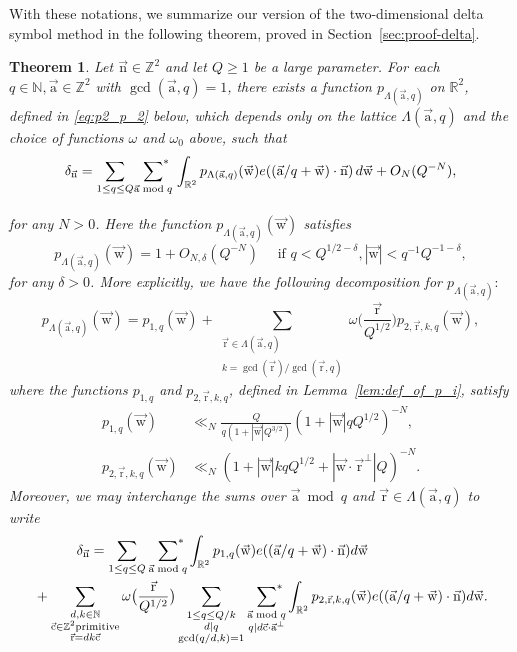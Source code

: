 \documentclass[letterpaper,11pt]{amsart}
\numberwithin{equation}{section}
\newtheorem{theorem}{Theorem}[section]
\theoremstyle{definition}
\numberwithin{equation}{section}
\newcommand{\Z}{\mathbb{Z}}
\newcommand{\ZZ}{\mathbb{Z}}
\newcommand{\NN}{\mathbb{N}}
\newcommand{\RR}{\mathbb{R}}
\renewcommand{\d}{\mathbf{d}}
\newcommand{\starsum}{\sideset{}{^*}\sum}
\newcommand{\ua}{\vec{\mathrm{a}}}
\newcommand{\ur}{\vec{\mathrm{r}}}
\newcommand{\uw}{{\vec{\mathrm{w}}}}
\newcommand{\uc}{{\vec{\mathrm{c}}}}
\newcommand{\N}{\mathbb{N}}
\newcommand{\R}{\mathbb{R}}
\newcommand{\nn}{\vec{\mathrm{n}}}
\begin{document}
With these notations, we summarize our version of the  two-dimensional delta symbol method in the following theorem, proved in Section~\ref{sec:proof-delta}.



\begin{theorem}\label{thm:delta}
		Let $\nn \in \mathbb Z^2$ and let $Q\geq 1$ be a large parameter.
	For each \(q\in \N,\ua\in \Z^2\) with \(\gcd(\ua,q)=1\),
	 there exists a function $p_{\Lambda(\ua,q)}$ on $\RR^2$, defined in \eqref{eq:p2_p_2} below, which depends only on the lattice \(\Lambda(\ua,q)\) and the choice of functions \(\omega\) and \(\omega_0\) above, such that
	\begin{equation}\label{eq:delta}
			\delta_{\nn}
			=
			\sum_{1\leq q\leq Q}
			\underset{\hphantom{\ua\bmod{q}}}{\starsum_{\ua\bmod{q}}}			
			\int_{\R^2}
			p_{\Lambda(\ua,q)}(\uw)
			e((\ua/q+\uw)\cdot\nn)\,d\uw
	+O_{N}(Q^{-N}),
	\end{equation}
	for any $N>0$.
Here the function
\(p_{\Lambda(\ua,q)}(\uw)\)  
satisfies 
\begin{equation}
    	\label{eq:p1bound1}
	p_{\Lambda(\ua,q)}(\uw)
	= 1+O_{N, \delta}(Q^{-N})
	\quad \text{ if } q< Q^{1/2-\delta},
	|\uw| < q^{-1} Q^{-1-\delta},
\end{equation}
for any $\delta>0$. More explicitly, we have the following decomposition for $p_{\Lambda(\ua,q)}:$ $$
p_{\Lambda(\ua,q)}(\uw)
=
 p_{1, q}(\uw)
 +	\sum_{\substack{\ur\in \Lambda(\ua,q)\\ k=\gcd(
 		\ur)/\gcd(\ur, q)}}\omega\big(\frac{\ur}{Q^{1/2}}\big) p_{2,\ur,k,q}(\uw),
 $$
where the functions $p_{1, q}$ and $p_{2,\ur,k,q}$, defined in Lemma~\ref{lem:def_of_p_i}, satisfy
	\begin{align}\label{eq:p1bound2}
	p_{1, q}(\uw)&\ll _N \frac{Q}{q(1+|\uw|Q^{3/2})}(1+|\uw|qQ^{1/2})^{-N},\\
 \label{eq:p1bound3}
p_{2,\ur,k,q}(\uw)
&\ll_{N}
(1+|\uw|kqQ^{1/2}+|\uw\cdot \ur^\perp|Q)^{-N}.
	\end{align}
Moreover, we may interchange the sums over $\ua\bmod q$ and $\ur\in\Lambda(\ua,q)$ to write
	\begin{align} \label{eq:delta0} 
			\delta_{\nn}
		&=\sum_{1\leq q\leq Q}\,\,\starsum_{\ua \bmod q}\int_{\mathbb{R}^2}p_{1,q}(\uw)e((\ua/q+\uw)\cdot \nn)d\uw\\
\MoveEqLeft[4]
+\sum_{\substack{d,k\in \NN\\ \uc \in \ZZ^2 \mathrm{ primitive }\\ \ur=dk\uc}}\omega\big(\frac{\ur}{Q^{1/2}}\big)\sum_{\substack{1\leq q\leq Q/k\\d\mid q\\ \gcd(q/d, k)=1}}\,\,\starsum_{\substack{\ua \bmod q\\q\mid d\uc \cdot\ua^\perp}}\int_{\R^2}p_{2,\ur,k,q}(\uw)e((\ua/q+\uw)\cdot \nn)d\uw.
	\end{align}
\end{theorem}  
\end{document}
